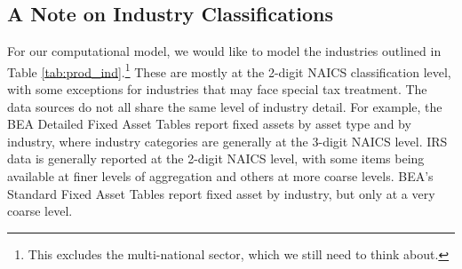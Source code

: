 \documentclass[article,11pt,letterpaper,fleqn]{article}
\theoremstyle{definition}
\numberwithin{equation}{section}
\begin{document}
\subsection{A Note on Industry Classifications}

For our computational model, we would like to model the industries outlined in Table \ref{tab:prod_ind}.\footnote{This excludes the multi-national sector, which we still need to think about.}  These are mostly at the 2-digit NAICS classification level, with some exceptions for industries that may face special tax treatment.  The data sources do not all share the same level of industry detail.  For example, the BEA Detailed Fixed Asset Tables report fixed assets by asset type and by industry, where industry categories are generally at the 3-digit NAICS level.  IRS data is generally reported at the 2-digit NAICS level, with some items being available at finer levels of aggregation and others at more coarse levels.  BEA's Standard Fixed Asset Tables report fixed asset by industry, but only at a very coarse level.  
\end{document}
